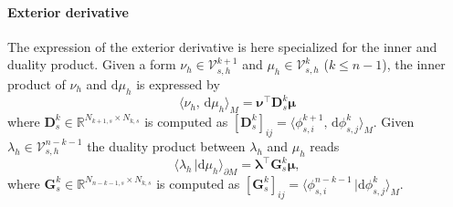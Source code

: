 \documentclass{elsarticle}
\renewcommand\d{\ensuremath{\mathrm{d}}}
\newcommand{\inpr}[3][]{\ensuremath{\langle #2, \, #3 \rangle_{#1}}}
\newcommand{\dualpr}[3][]{\ensuremath{\langle #2 \, \vert #3 \rangle_{#1}}}
\begin{document}
\paragraph{Exterior derivative}
The expression of the exterior derivative is here specialized for the inner and duality product. Given a form $\nu_h \in \mathcal{V}_{s, h}^{k+1}$ and $\mu_h \in \mathcal{V}_{s, h}^{k}$ ($k\le n-1$), the inner product of $\nu_h$ and $\d \mu_h$ is expressed by
\begin{equation}\label{eq:alg_d_inner}
    \inpr[M]{\nu_h}{\d\mu_h} = \bm{\nu}^\top \mathbf{D}^{k}_s \bm{\mu}
\end{equation}
where $\mathbf{D}^{k}_s \in \mathbb{R}^{N_{k+1, s} \times N_{k, s}}$ is computed as  $[\mathbf{D}^{k}_s]_{ij} = \inpr[M]{\phi_{s, i}^{k+1}}{\d\phi_{s, j}^{k}}.$ Given $\lambda_h \in \mathcal{V}_{s, h}^{n-k-1}$ the duality product between $\lambda_h$ and $\mu_h$ reads
\begin{equation}\label{eq:alg_d_dualpr}
    \dualpr[\partial M]{\lambda_h}{\d \mu_h} = \bm{\lambda}^\top \mathbf{G}^k_s \bm{\mu}, 
\end{equation}
where $\mathbf{G}^{k}_s \in \mathbb{R}^{N_{n-k-1, s} \times N_{k, s}}$ is computed as  $[\mathbf{G}^{k}_s]_{ij} = \dualpr[M]{\phi_{s, i}^{n-k-1}}{\d\phi_{s, j}^{k}}.$ 
\end{document}
